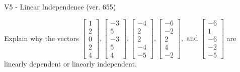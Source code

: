\begin{exercise}
  \begin{exerciseTitle}V5 - Linear Independence (ver. 655)\end{exerciseTitle}
  \begin{exerciseStatement}
    Explain why the vectors \(\left[\begin{array}{r}
1 \\
2 \\
0 \\
2 \\
4
\end{array}\right] , \left[\begin{array}{r}
-3 \\
5 \\
-3 \\
5 \\
4
\end{array}\right] , \left[\begin{array}{r}
-4 \\
2 \\
2 \\
-4 \\
-5
\end{array}\right] , \left[\begin{array}{r}
-6 \\
-2 \\
2 \\
4 \\
-2
\end{array}\right] , \text{ and } \left[\begin{array}{r}
-6 \\
1 \\
-6 \\
-2 \\
-5
\end{array}\right]\) are linearly dependent or linearly independent.	



\end{exerciseStatement}
\end{exercise}
